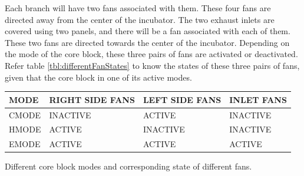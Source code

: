 \documentclass[../../main]{subfiles}
\begin{document}
Each branch will have two fans associated with them. These four fans are directed away
from the center of the incubator. The two exhaust inlets are covered using two panels,
and there will be a fan associated with each of them. These two fans are directed towards
the center of the incubator. Depending on the mode of the core block, these three pairs of
fans are activated or deactivated. Refer table \ref{tbl:differentFanStates} to know
the states of these three pairs of fans, given that the core block in one of its active modes.

\begin{center}

    \begin{tabularx} {\textwidth} {
            >{\ttfamily \centering \arraybackslash}m{2cm}
            >{\ttfamily \centering \arraybackslash}X
            >{\ttfamily \centering \arraybackslash}X
            >{\ttfamily \centering \arraybackslash}X
        }

        \toprule

        MODE & RIGHT SIDE FANS & LEFT SIDE FANS & INLET FANS \\

        \midrule

        CMODE & INACTIVE & ACTIVE & INACTIVE \\
        HMODE & ACTIVE & INACTIVE & INACTIVE \\
        EMODE & ACTIVE & ACTIVE & ACTIVE \\

        \bottomrule

    \end{tabularx}

     {Different core block modes and corresponding state of different fans.}
    \label{tbl:differentFanStates}

\end{center}
\end{document}
